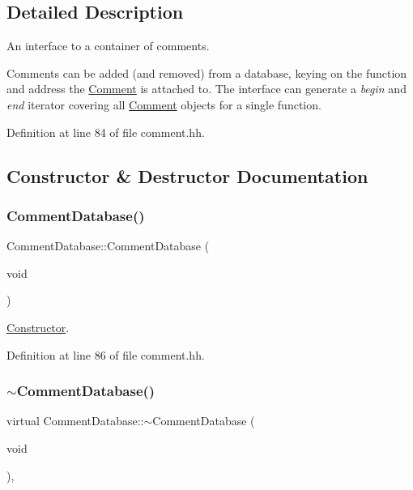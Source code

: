 \subsection{Detailed Description}
An interface to a container of comments. 

Comments can be added (and removed) from a database, keying on the function and address the \mbox{\hyperlink{class_comment}{Comment}} is attached to. The interface can generate a {\itshape begin} and {\itshape end} iterator covering all \mbox{\hyperlink{class_comment}{Comment}} objects for a single function. 

Definition at line 84 of file comment.\+hh.



\subsection{Constructor \& Destructor Documentation}
\mbox{\label{class_comment_database_a64f6c407ba9610d5375d228236e8d26f}} 
\subsubsection{\texorpdfstring{CommentDatabase()}{CommentDatabase()}}
{\footnotesize\ttfamily Comment\+Database\+::\+Comment\+Database (\begin{DoxyParamCaption}\item[{void}]{ }\end{DoxyParamCaption})\hspace{0.3cm}{\ttfamily [inline]}}



\mbox{\hyperlink{class_constructor}{Constructor}}. 



Definition at line 86 of file comment.\+hh.

\mbox{\label{class_comment_database_a0851784ab66cc52511427c6ec31073cd}} 
\subsubsection{\texorpdfstring{$\sim$CommentDatabase()}{~CommentDatabase()}}
{\footnotesize\ttfamily virtual Comment\+Database\+::$\sim$\+Comment\+Database (\begin{DoxyParamCaption}\item[{void}]{ }\end{DoxyParamCaption})\hspace{0.3cm}{\ttfamily [inline]}, {\ttfamily [virtual]}}



